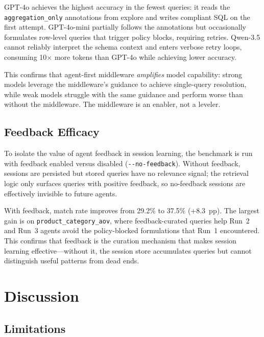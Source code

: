 \documentclass[sigconf, nonacm]{acmart}
\begin{document}
GPT-4o achieves the highest accuracy in the fewest queries: it reads the
\texttt{aggregation\_only} annotations from explore and writes compliant
SQL on the first attempt.  GPT-4o-mini partially follows the annotations
but occasionally formulates row-level queries that trigger policy blocks,
requiring retries.  Qwen-3.5 cannot reliably interpret the schema context
and enters verbose retry loops, consuming 10$\times$ more tokens than
GPT-4o while achieving lower accuracy.

This confirms that agent-first middleware \emph{amplifies} model capability:
strong models leverage the middleware's guidance to achieve single-query
resolution, while weak models struggle with the same guidance and perform
worse than without the middleware.  The middleware is an enabler, not a
leveler.

\subsection{Feedback Efficacy}
\label{sec:feedback}

To isolate the value of agent feedback in session learning, the benchmark
is run with feedback enabled versus disabled
(\texttt{-{}-no-feedback}).  Without feedback, sessions are persisted but
stored queries have no relevance signal; the retrieval logic only surfaces
queries with positive feedback, so no-feedback sessions are effectively
invisible to future agents.

With feedback, match rate improves from 29.2\% to 37.5\% (+8.3~pp).
The largest gain is on \texttt{product\_category\_aov}, where
feedback-curated queries help Run~2 and Run~3 agents avoid the
policy-blocked formulations that Run~1 encountered.  This confirms that
feedback is the curation mechanism that makes session learning
effective---without it, the session store accumulates queries but cannot
distinguish useful patterns from dead ends.


\section{Discussion}
\label{sec:discussion}

\subsection{Limitations}
\end{document}
